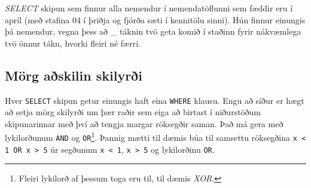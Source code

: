 \begin{example}
\caption[LIKE með nákvæmum stafafjölda]{\emph{SELECT} skipun sem finnur alla nemendur í nemendatöflunni sem fæddir eru í apríl (með stafina 04 í þriðja og fjórða sæti í kennitölu sinni). Hún finnur einungis þá nemendur, vegna þess að \_ táknin tvö geta komið í staðinn fyrir nákvæmlega tvö önnur tákn, hvorki fleiri né færri.}
\label{sql:k4d12-like-kennitala}
\centering
{}
\end{example}

\subsection{Mörg aðskilin skilyrði} %
Hver \verb|SELECT| skipun getur einungis haft eina \verb|WHERE| klausu. Engu að síður er hægt að setja mörg skilyrði um þær raðir sem eiga að birtast í niðurstöðum skipunarinnar með því að tengja margar röksegðir saman. Það má gera með lykilorðunum \verb|AND| og \verb|OR|\footnote{Fleiri lykilorð af þessum toga eru til, til dæmis \emph{XOR}.}. Þannig mætti til dæmis búa til samsettu röksegðina \verb|x < 1 OR x > 5| úr segðunum \verb|x < 1|, \verb|x > 5| og lykilorðinu \verb|OR|.

